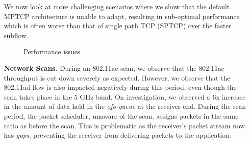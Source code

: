 We now look at more challenging scenarios where we show that the 
default MPTCP architecture is unable to adapt, resulting in sub-optimal 
performance which is often worse than that of single path TCP (SPTCP) over the
faster subflow.

\begin{figure*}[ht]
    \centering
    \hfill
    \hfill
    \vspace{-0.15in}
    \caption{Performance issues.}
\end{figure*}
\fi

\noindent\textbf{Network Scans. }
During an 802.11ac scan, we observe that the 802.11ac throughput
is cut down severely as expected.
However, we 
observe that the 802.11ad flow is also impacted negatively during this period, even though the scan takes place in the 
5 GHz band. On investigation, we observed a 6x increase in the amount of data held in 
the \emph{ofo-queue} at the receiver end. During the scan period, the packet
scheduler, unaware of the scan, assigns packets in the same ratio as before the scan. This is 
problematic as the receiver's packet stream now has \textit{gaps}, 
preventing the receiver from delivering packets to the application. 

